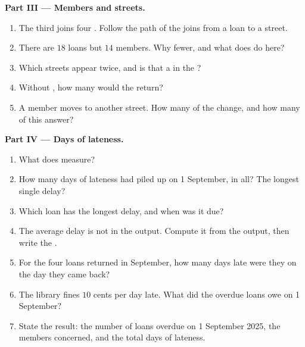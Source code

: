 \begin{problem}
\medskip\noindent\textbf{Part III --- Members and streets.}
\begin{enumerate}[resume]
  \item The third  joins four . Follow the path of the joins from a loan to a street.
  \item There are $18$ loans but $14$ members. Why fewer, and what does  do here?
  \item Which streets appear twice, and is that a  in the ?
  \item Without , how many  would the  return?
  \item A member moves to another street. How many  of the  change, and how many  of this answer?
\end{enumerate}

\medskip\noindent\textbf{Part IV --- Days of lateness.}
\begin{enumerate}[resume]
  \item What does  measure?
  \item How many days of lateness had piled up on 1 September, in all? The longest single delay?
  \item Which loan has the longest delay, and when was it due?
  \item The average delay is not in the output. Compute it from the output, then write the .
  \item For the four loans returned in September, how many days late were they on the day they came back?
  \item The library fines $10$ cents per day late. What did the overdue loans owe on 1 September?
  \item State the result: the number of loans overdue on 1 September 2025, the members concerned, and the total days
    of lateness.
\end{enumerate}
\end{problem}
